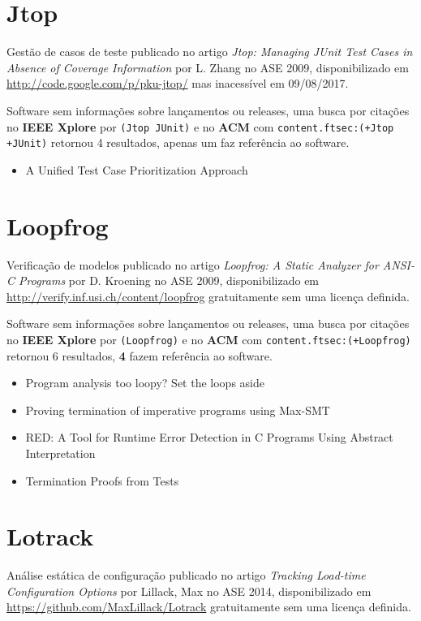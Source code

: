 \section{Jtop}

Gestão de casos de teste
publicado no artigo {\it Jtop: Managing JUnit Test Cases in Absence of Coverage Information}
por L. Zhang
no ASE 2009,
disponibilizado em \url{http://code.google.com/p/pku-jtop/}
mas inacessível em 09/08/2017.

Software sem informações sobre lançamentos ou releases,
uma busca por citações no {\bf IEEE Xplore} por
\texttt{(Jtop JUnit)}
e no {\bf ACM} com
\texttt{content.ftsec:(+Jtop +JUnit)}
retornou
4 resultados,
apenas um faz referência ao software.

\begin{itemize}
\item A Unified Test Case Prioritization Approach
\end{itemize}

\section{Loopfrog}

Verificação de modelos
publicado no artigo {\it Loopfrog: A Static Analyzer for ANSI-C Programs}
por D. Kroening
no ASE 2009,
disponibilizado em \url{http://verify.inf.usi.ch/content/loopfrog}
gratuitamente
sem uma licença definida.

Software sem informações sobre lançamentos ou releases,
uma busca por citações no {\bf IEEE Xplore} por
\texttt{(Loopfrog)}
e no {\bf ACM} com
\texttt{content.ftsec:(+Loopfrog)}
retornou
6 resultados,
{\bf 4} fazem referência ao software.

\begin{itemize}
\item Program analysis too loopy? Set the loops aside
\item Proving termination of imperative programs using Max-SMT
\item RED: A Tool for Runtime Error Detection in C Programs Using Abstract Interpretation
\item Termination Proofs from Tests
\end{itemize}

\section{Lotrack}

Análise estática de configuração
publicado no artigo {\it Tracking Load-time Configuration Options}
por Lillack, Max
no ASE 2014,
disponibilizado em \url{https://github.com/MaxLillack/Lotrack}
gratuitamente
sem uma licença definida.

